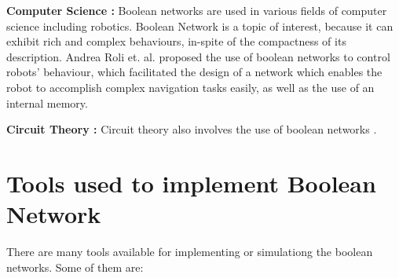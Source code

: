 \documentclass[11pt]{report}
\begin{document}
    \textbf{Computer Science : } Boolean networks are used in various fields of computer science including robotics.
    Boolean Network is a topic of interest, because it can exhibit rich and complex behaviours, in-spite of the compactness of its description.
    Andrea Roli et. al. \cite{Roli2011} proposed the use of boolean networks to control robots' behaviour, which facilitated the design of a network which enables the robot to accomplish complex navigation tasks easily, as well as the use of an internal memory.
    
    \textbf{Circuit Theory : } Circuit theory also involves the use of boolean networks \cite{Goles2010}.
    
    \section{Tools used to implement Boolean Network}
    There are many tools available for implementing or simulationg the boolean networks.
    Some of them are:
\end{document}
